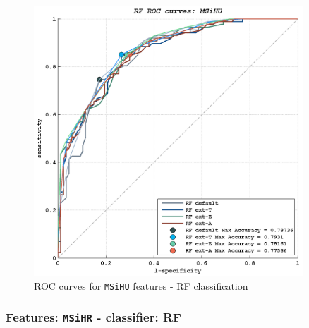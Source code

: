 
\begin{figure}[!hb]
  \centering
    \includegraphics[width=0.90\textwidth]{./images/Ch6/Fig3/RF_ROC_MSiHU_crop.png}
    \caption{ROC curves for \texttt{MSiHU} features - RF classification}
    \label{ch6:fig4}
\end{figure}



\vspace{0.5cm}

\subsubsection{Features: \texttt{MSiHR} - classifier: RF}

